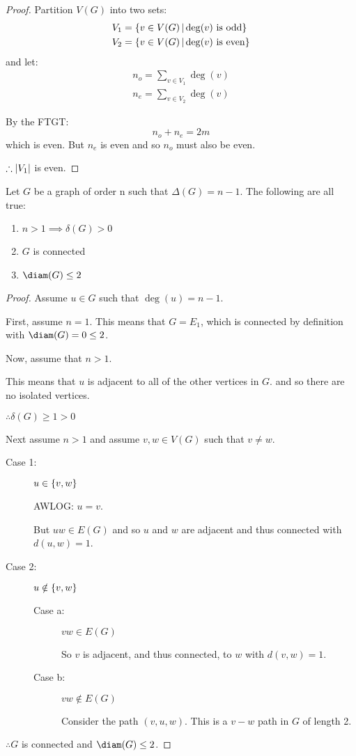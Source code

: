 \documentclass[letterpaper,12pt,fleqn]{article}
\renewcommand{\d}{\delta}
\newcommand{\D}{\Delta}
\begin{document}
\begin{proof}
  Partition \(V(G)\) into two sets:
  \begin{align*}
    V_1 &= \left\{{v\in V(G)}\,\middle|\,{\deg(v)\ \text{is odd}}\right\} \\
    V_2 &= \left\{{v\in V(G)}\,\middle|\,{\deg(v)\ \text{is even}}\right\}
  \end{align*}
  and let:
  \begin{align*}
    n_o=\sum_{v\in V_1}\deg(v) \\
    n_e=\sum_{v\in V_2}\deg(v)
  \end{align*}

  By the FTGT:
  \[n_o+n_e=2m\]
  which is even.  But \(n_e\) is even and so \(n_o\) must also be even.

  \(\therefore\lvert V_1\rvert\) is even.
\end{proof}

\begin{theorem}
  Let \(G\) be a graph of order n such that \(\D(G)=n-1\).  The following are all true:
  \begin{enumerate}
  \item \(n>1\implies\d(G)>0\)
  \item \(G\) is connected
  \item \(\diam(G)\le2\)
  \end{enumerate}
\end{theorem}

\begin{proof}
  Assume \(u\in G\) such that \(\deg(u)=n-1\).

  First, assume \(n=1\).  This means that \(G=E_1\), which is connected by definition with \(\diam(G)=0\le2\).

  Now, assume that \(n>1\).
  
  This means that \(u\) is adjacent to all of the other vertices in \(G\). and so there are no isolated vertices.

  \(\therefore\d(G)\ge1>0\)
  
  Next assume \(n>1\) and assume \(v,w\in V(G)\) such that \(v\ne w\).
  \begin{description}
  \item[Case 1:] \(u\in\{v,w\}\)
    
    AWLOG: \(u=v\).
    
    But \(uw\in E(G)\) and so \(u\) and \(w\) are adjacent and thus connected with \(d(u,w)=1\).

  \item[Case 2:] \(u\notin\{v,w\}\)
    \begin{description}
    \item[Case a:] \(vw\in E(G)\)
      
      So \(v\) is adjacent, and thus connected, to \(w\) with \(d(v,w)=1\).

    \item[Case b:] \(vw\notin E(G)\)

      Consider the path \((v,u,w)\).  This is a \(v-w\) path in \(G\) of length 2.
    \end{description}
  \end{description}

  \(\therefore G\) is connected and \(\diam(G)\le2\).
\end{proof}
\end{document}

